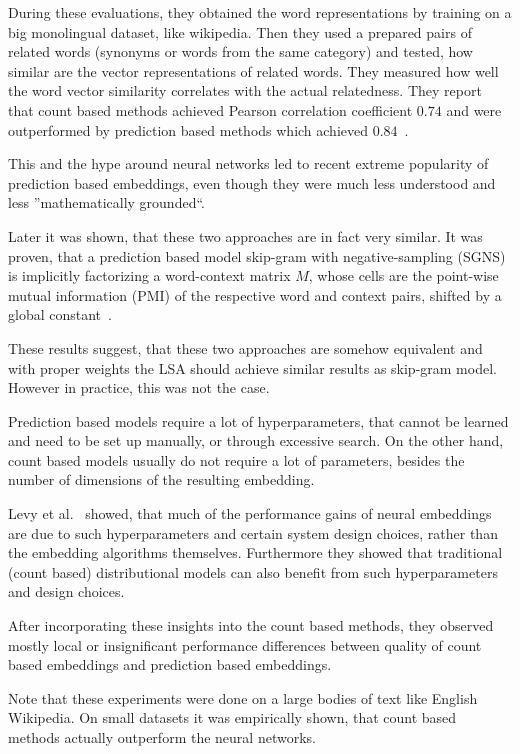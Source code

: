     During these evaluations, they obtained the word representations by training on a big monolingual dataset, like wikipedia.
    Then they used a prepared pairs of related words (synonyms or words from the same category) and tested,
    how similar are the vector representations of related words. 
    They measured how well the word vector similarity correlates with the actual relatedness. 
    They report that count based methods achieved Pearson correlation coefficient $0.74$ and were outperformed by prediction based methods which achieved $0.84$~\cite{baroni2014don}.
    
    This and the hype around neural networks led to recent extreme popularity of prediction based embeddings,
    even though they were much less understood and less ''mathematically grounded``.
    
    Later it was shown, that these two approaches are in fact very similar.
    It was proven, that a prediction based model skip-gram with negative-sampling (SGNS) 
    is implicitly factorizing a word-context matrix $M$,
    whose cells are the point-wise mutual information (PMI) of the respective word and context pairs, 
    shifted by a global constant~\cite{levy2014neural}. %
    
    These results suggest, that these two approaches are somehow equivalent and with proper weights the LSA should achieve similar results as skip-gram model. 
    However in practice, this was not the case.
    
    Prediction based models require a lot of hyperparameters, that cannot be learned and need to be set up manually,
    or through excessive search.
    On the other hand, count based models usually do not require a lot of parameters, besides the number of dimensions of the resulting embedding. 
    
    Levy et al.~\cite{levy2015improving} %
    showed, that much  of  the  performance  gains  of  neural embeddings  are  due  to such hyperparameters and certain system design choices, rather than the embedding algorithms themselves. 
    Furthermore they showed that traditional (count based) distributional models
    can also benefit from such hyperparameters and design choices.
    
    After incorporating these insights into the count based methods, 
    they observed mostly local or insignificant performance differences between quality of count based embeddings and prediction based embeddings.
    
    Note that these experiments were done on a large bodies of text like English Wikipedia.   
    On small datasets it was empirically shown, that count based methods actually outperform the neural networks\cite{altszyler2016comparative}. %
    
    
